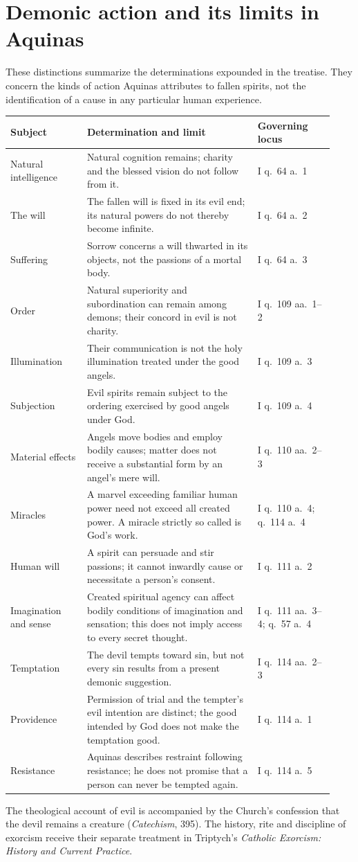 \section{Demonic action and its limits in Aquinas}
\label{app:powers}

These distinctions summarize the determinations expounded in the treatise.
They concern the kinds of action Aquinas attributes to fallen spirits,
not the identification of a cause in any particular human experience.

\begin{longtable}{@{}>{\raggedright\arraybackslash}p{0.22\linewidth}>{\raggedright\arraybackslash}p{0.49\linewidth}>{\raggedright\arraybackslash}p{0.22\linewidth}@{}}
\toprule
Subject & Determination and limit & Governing locus\\
\midrule\endhead
Natural intelligence & Natural cognition remains; charity and the blessed
vision do not follow from it. & I q.~64 a.~1\\
The will & The fallen will is fixed in its evil end; its natural powers do
not thereby become infinite. & I q.~64 a.~2\\
Suffering & Sorrow concerns a will thwarted in its objects, not the passions
of a mortal body. & I q.~64 a.~3\\
Order & Natural superiority and subordination can remain among demons;
their concord in evil is not charity. & I q.~109 aa.~1--2\\
Illumination & Their communication is not the holy illumination treated
under the good angels. & I q.~109 a.~3\\
Subjection & Evil spirits remain subject to the ordering exercised by good
angels under God. & I q.~109 a.~4\\
Material effects & Angels move bodies and employ bodily causes; matter does
not receive a substantial form by an angel's mere will. & I q.~110 aa.~2--3\\
Miracles & A marvel exceeding familiar human power need not exceed all
created power. A miracle strictly so called is God's work. & I q.~110 a.~4;
q.~114 a.~4\\
Human will & A spirit can persuade and stir passions; it cannot inwardly
cause or necessitate a person's consent. & I q.~111 a.~2\\
Imagination and sense & Created spiritual agency can affect bodily
conditions of imagination and sensation; this does not imply access to
every secret thought. & I q.~111 aa.~3--4;
q.~57 a.~4\\
Temptation & The devil tempts toward sin, but not every sin results from
a present demonic suggestion. & I q.~114 aa.~2--3\\
Providence & Permission of trial and the tempter's evil intention are
distinct; the good intended by God does not make the temptation good. &
I q.~114 a.~1\\
Resistance & Aquinas describes restraint following resistance; he does not
promise that a person can never be tempted again. & I q.~114 a.~5\\
\bottomrule
\end{longtable}

The theological account of evil is accompanied by the Church's confession
that the devil remains a creature (\emph{Catechism}, 395). The history,
rite and discipline of exorcism receive their separate treatment in
Triptych's \emph{Catholic Exorcism: History and Current Practice}.
